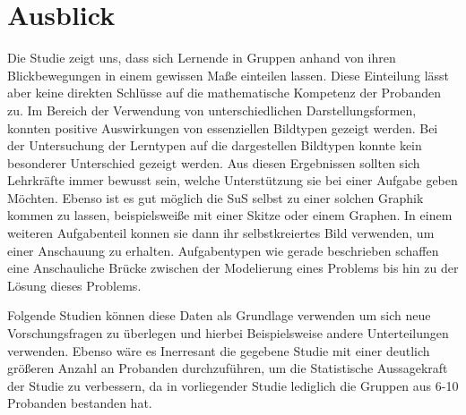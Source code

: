 \chapter{Ausblick}
Die Studie zeigt uns, dass sich Lernende in Gruppen anhand von ihren Blickbewegungen in einem gewissen Maße einteilen lassen. Diese Einteilung lässt aber keine direkten Schlüsse auf die mathematische Kompetenz der Probanden zu.  Im Bereich der Verwendung von unterschiedlichen Darstellungsformen, konnten positive Auswirkungen von essenziellen Bildtypen gezeigt werden. Bei der Untersuchung der Lerntypen auf die dargestellen Bildtypen konnte kein besonderer Unterschied gezeigt werden. Aus diesen Ergebnissen sollten sich Lehrkräfte immer bewusst sein, welche Unterstützung sie bei einer Aufgabe geben Möchten. Ebenso ist es gut möglich die SuS selbst zu einer solchen Graphik kommen zu lassen, beispielsweiße mit einer Skitze oder einem Graphen. In einem weiteren Aufgabenteil konnen sie dann ihr selbstkreiertes Bild verwenden, um einer Anschauung zu erhalten. Aufgabentypen wie gerade beschrieben schaffen eine Anschauliche Brücke zwischen der Modelierung eines Problems bis hin zu der Lösung dieses Problems.


Folgende Studien können diese Daten als Grundlage verwenden um sich neue Vorschungsfragen zu überlegen und hierbei Beispielsweise andere Unterteilungen verwenden. Ebenso wäre es Inerresant die gegebene Studie mit einer deutlich größeren Anzahl an Probanden durchzuführen, um die Statistische Aussagekraft der Studie zu verbessern, da in vorliegender Studie lediglich die Gruppen aus 6-10 Probanden bestanden hat.



